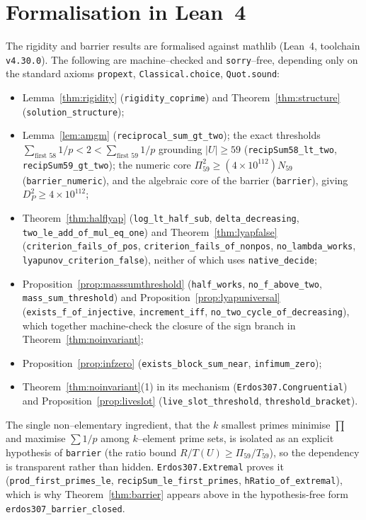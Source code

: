 \documentclass[11pt]{article}
\theoremstyle{definition}
\begin{document}
\section{Formalisation in Lean~4}\label{sec:lean}

The rigidity and barrier results are formalised against mathlib (Lean~4, toolchain
\texttt{v4.30.0}). The following are machine--checked and \texttt{sorry}--free, depending only on the
standard axioms \texttt{propext}, \texttt{Classical.choice}, \texttt{Quot.sound}:
\begin{itemize}[leftmargin=1.4em]
\item Lemma~\ref{thm:rigidity} (\texttt{rigidity\_coprime}) and Theorem~\ref{thm:structure}
(\texttt{solution\_structure});
\item Lemma~\ref{lem:amgm} (\texttt{reciprocal\_sum\_gt\_two}); the exact thresholds
$\sum_{\text{first }58}1/p<2<\sum_{\text{first }59}1/p$ grounding $|U|\ge59$
(\texttt{recipSum58\_lt\_two}, \texttt{recipSum59\_gt\_two}); the numeric core
$\Pi_{59}^2\ge(4\times10^{112})N_{59}$ (\texttt{barrier\_numeric}), and the algebraic core of the
barrier (\texttt{barrier}), giving $D_P^2\ge4\times10^{112}$;
\item Theorem~\ref{thm:halflyap} (\texttt{log\_lt\_half\_sub}, \texttt{delta\_decreasing},
\texttt{two\_le\_add\_of\_mul\_eq\_one}) and Theorem~\ref{thm:lyapfalse}
(\texttt{criterion\_fails\_of\_pos}, \texttt{criterion\_fails\_of\_nonpos},
\texttt{no\_lambda\_works}, \texttt{lyapunov\_criterion\_false}), neither of which uses
\texttt{native\_decide};
\item Proposition~\ref{prop:masssumthreshold} (\texttt{half\_works}, \texttt{no\_f\_above\_two},
\texttt{mass\_sum\_threshold}) and Proposition~\ref{prop:lyapuniversal}
(\texttt{exists\_f\_of\_injective}, \texttt{increment\_iff},
\texttt{no\_two\_cycle\_of\_decreasing}), which together machine-check the closure of the sign
branch in Theorem~\ref{thm:noinvariant};
\item Proposition~\ref{prop:infzero} (\texttt{exists\_block\_sum\_near}, \texttt{infimum\_zero});
\item Theorem~\ref{thm:noinvariant}(1) in its mechanism (\texttt{Erdos307.Congruential}) and
Proposition~\ref{prop:liveslot} (\texttt{live\_slot\_threshold}, \texttt{threshold\_bracket}).
\end{itemize}
The single non--elementary ingredient, that the $k$ smallest primes minimise $\prod$ and maximise
$\sum1/p$ among $k$--element prime sets, is isolated as an explicit hypothesis of \texttt{barrier}
(the ratio bound $R/T(U)\ge\Pi_{59}/T_{59}$), so the dependency is transparent rather than hidden.
\texttt{Erdos307.Extremal} proves it
(\texttt{prod\_first\_primes\_le}, \texttt{recipSum\_le\_first\_primes},
\texttt{hRatio\_of\_extremal}), which is why Theorem~\ref{thm:barrier} appears above in the
hypothesis-free form \texttt{erdos307\_barrier\_closed}.
\end{document}
